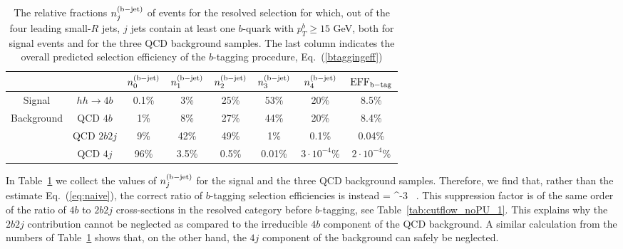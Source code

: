 \begin{table}[t]
  \centering
  \small
  \begin{tabular}{|c|c|c|c|c|c|c|c|}
    \hline
  \multicolumn{2}{|c|}{}   &  $n^{\rm (b-jet)}_0$  &  $n^{\rm (b-jet)}_1$  &  $n^{\rm (b-jet)}_2$  & $n^{\rm (b-jet)}_3$ &
    $n^{\rm (b-jet)}_4$ & ${\rm EFF}_{\rm b-tag}$ \\
    \hline
    \hline
    Signal  &  $hh\to 4b$  &   0.1\%    & 3\%     &  25\%     & 53\%     & 20\%      & 8.5\%  \\
    \hline
    \multirow{3}{*}{Background}  &  QCD $4b$  & 1\%      &  8\%    &   27\%   &  44\%     & 20\%       &  8.4\% \\
     &  QCD $2b2j$  &   9\%    & 42\%     &  49\%    & 1\%     &  0.1\%     & 0.04\%  \\
    &  QCD $4j$  &   96\%    &  3.5\%     & 0.5\%     &  0.01\%    & $3\cdot 10^{-4}$\%      &
    $2\cdot 10^{-4}$\%\\
    \hline
  \end{tabular}
  \caption{\small
    The relative fractions  $n^{\rm (b-jet)}_j$ of events for the resolved selection
    for which, out of the four leading small-$R$ jets, $j$ jets
    contain at least one $b$-quark with $p_T^b\ge 15$ GeV,
    both for signal events and for the three QCD background samples.
    The last column indicates the overall predicted
    selection efficiency of the $b$-tagging procedure,
    Eq.~(\ref{btaggingeff})
    \label{tab:btaggingcheck}
  }
  \end{table}

In Table~\ref{tab:btaggingcheck} we collect
the values of $n^{\rm (b-jet)}_j$ for the signal and the three QCD background samples.
%
Therefore, we find that, rather than the estimate Eq.~(\ref{eq:naive}),
the correct ratio of $b$-tagging selection efficiencies is instead
\be
{}=
   ^{-3} \, .
  \ee
  This suppression factor is of the same order of the ratio of $4b$ to $2b2j$ cross-sections
  in the resolved category before $b$-tagging, see Table~\ref{tab:cutflow_noPU_1}.
    This explains why the $2b2j$ contribution cannot be neglected as compared
    to the irreducible $4b$ component of the QCD background.
    A similar calculation from the numbers of Table~\ref{tab:btaggingcheck} shows
    that, on the other hand, the $4j$ component of the background can safely
    be neglected.
    






%
